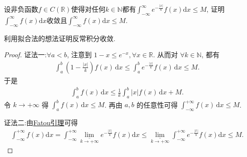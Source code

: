 \documentclass[../../main.tex]{subfiles}%
\begin{document}
\begin{example}
设非负函数$f \in C(\mathbb{R})$使得对任何$k \in \mathbb{N}$都有$\int_{-\infty}^{\infty} e^{-\frac{|x|}{k}} f(x) \mathrm{d}x \leqslant M$, 证明$\int_{-\infty}^{\infty} f(x) \mathrm{d}x$收敛且$\int_{-\infty}^{\infty} f(x) \mathrm{d}x \leqslant M$.
\end{example}
\begin{note}
利用拟合法的想法证明反常积分收敛.
\end{note}
\begin{proof}

{\color{blue} 证法一:}$\forall a < b$, 注意到 $1 - x \leqslant e^{-x}, \forall x \in \mathbb{R}$. 从而对 $\forall k \in \mathbb{N}$, 都有
\begin{align*}
\int_a^b \left( 1 - \frac{|x|}{k} \right) f(x) \, \mathrm{d}x \leqslant \int_a^b e^{-\frac{|x|}{k}} f(x) \, \mathrm{d}x \leqslant M.
\end{align*}
于是
\begin{align*}
\int_a^b f(x) \, \mathrm{d}x \leqslant \frac{1}{k} \int_a^b |x| f(x) \, \mathrm{d}x + M.
\end{align*}
令 $k \to +\infty$ 得 $\int_a^b f(x) \, \mathrm{d}x \leqslant M$. 再由 $a, b$ 的任意性可得 $\int_{-\infty}^{+\infty} f(x) \, \mathrm{d}x \leqslant M$.

{\color{blue} 证法二:}由\hyperref[Real-Analysis-theorem:Fatou引理]{Fatou引理}可得
\begin{align*}
\int_{-\infty}^{+\infty}{f\left( x \right) \mathrm{d}x}=\int_{-\infty}^{+\infty}{\underset{k\rightarrow +\infty}{\underline{\lim }}e^{-\frac{\left| x \right|}{k}}f\left( x \right) \mathrm{d}x}\leqslant \underset{k\rightarrow +\infty}{\underline{\lim }}\int_{-\infty}^{+\infty}{e^{-\frac{\left| x \right|}{k}}f\left( x \right) \mathrm{d}x}\leqslant M.
\end{align*}

\end{proof}
\end{document}
